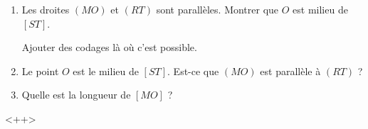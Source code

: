 
\begin{exercice}\label{exosmath-1001}

    \begin{enumerate}
        \item
        Les droites \( (MO)\) et \( (RT)\) sont parallèles. Montrer que \( O\) est milieu de \( [ST]\).
        \begin{center}
            
        \end{center}
        Ajouter des codages là où c'est possible.
    \item
        Le point \( O\) est le milieu de \( [ST]\). Est-ce que \( (MO)\) est parallèle à \( (RT)\) ?
        \begin{center}
            
        \end{center}
    \item
        Quelle est la longueur de \( [MO]\) ?
        \begin{center}
            
        \end{center}
    \end{enumerate}
    <++>

\end{exercice}
